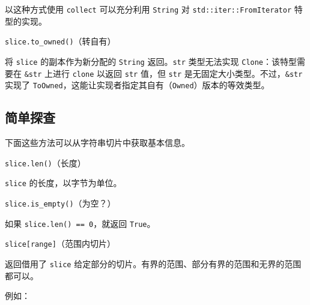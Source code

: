 以这种方式使用 \texttt{collect} 可以充分利用 \texttt{String} 对 \texttt{std::iter::FromIterator} 特型的实现。

\begin{mySidenote}
\texttt{slice.to\_owned()}（转自有）
\end{mySidenote}

将 \texttt{slice} 的副本作为新分配的 \texttt{String} 返回。\texttt{str} 类型无法实现 \texttt{Clone}：该特型需要在 \texttt{\&str} 上进行 \texttt{clone} 以返回 \texttt{str} 值，但 \texttt{str} 是无固定大小类型。不过，\texttt{\&str} 实现了 \texttt{ToOwned}，这能让实现者指定其自有（\texttt{Owned}）版本的等效类型。

\subsection{简单探查}

下面这些方法可以从字符串切片中获取基本信息。

\begin{mySidenote}
\texttt{slice.len()}（长度）
\end{mySidenote}

\texttt{slice} 的长度，以字节为单位。

\begin{mySidenote}
\texttt{slice.is\_empty()}（为空？）
\end{mySidenote}

如果 \texttt{slice.len() == 0}，就返回 \texttt{True}。

\begin{mySidenote}
\texttt{slice[range]}（范围内切片）
\end{mySidenote}

返回借用了 \texttt{slice} 给定部分的切片。有界的范围、部分有界的范围和无界的范围都可以。

例如：


